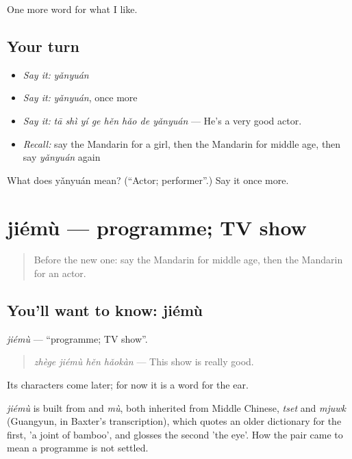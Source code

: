 \begin{grammarlens}[title={What you've built}]
One more word for what I like.
\end{grammarlens}

\subsection*{Your turn}
\begin{itemize}
\raggedright
  \item \emph{Say it:} \emph{yǎnyuán}
  \item \emph{Say it:} \emph{yǎnyuán}, once more
  \item \emph{Say it:} \emph{tā shì yí ge hěn hǎo de yǎnyuán} — He's a very good actor.
  \item \emph{Recall:} say the Mandarin for a girl, then the Mandarin for middle age, then say \emph{yǎnyuán} again
\end{itemize}

\begin{tcolorbox}[breakable,colback=teal!4,colframe=teal!35!black,title={Before you move on}]
What does yǎnyuán mean? (\textquotedblleft{}Actor; performer\textquotedblright{}.) Say it once more.
\end{tcolorbox}
\section[jiémù]{jiémù — programme; TV show}

\label{lesson:ZH-C267-jiemu}



\begin{quote}
Before the new one: say the Mandarin for middle age, then the Mandarin for an actor.
\end{quote}

\subsection*{You'll want to know: jiémù}
\emph{jiémù} — \textquotedblleft{}programme; TV show\textquotedblright{}.

\begin{quote}
\emph{zhège jiémù hěn hǎokàn} — This show is really good.
\end{quote}

Its characters come later; for now it is a word for the ear.

\begin{cousinweb}
\emph{jiémù} is built from  and \emph{mù}, both inherited from Middle Chinese, \emph{tset} and \emph{mjuwk} (Guangyun, in Baxter's transcription), which quotes an older dictionary for the first, 'a joint of bamboo', and glosses the second 'the eye'. How the pair came to mean a programme is not settled.
\end{cousinweb}

